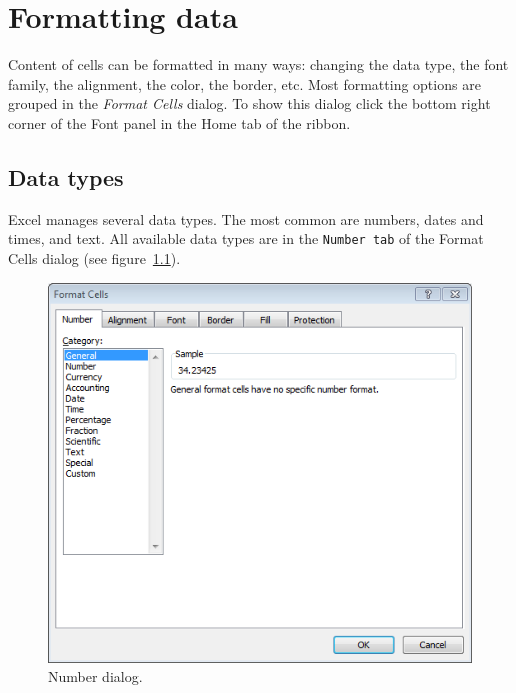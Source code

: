 
\chapter{Formatting data}

Content of cells can be formatted in many ways: changing the data type, the font family, the alignment, the color, the border, etc. Most formatting options are grouped in the \emph{Format Cells} dialog. To show this dialog click the bottom right corner of the Font panel in the Home tab of the ribbon.

\section{Data types}\hypertarget{data-types}{}\label{data-types}

Excel manages several data types. The most common are numbers, dates and times, and text. All available data types are
in the \texttt{Number tab} of the Format Cells dialog (see figure~\ref{img-number_dialog}).

\begin{figure}[htbp]
\begin{center}
\includegraphics[scale=0.7]{../img/number_dialog.png}
\end{center}
\caption{Number dialog.}
\label{img-number_dialog}
\end{figure}

